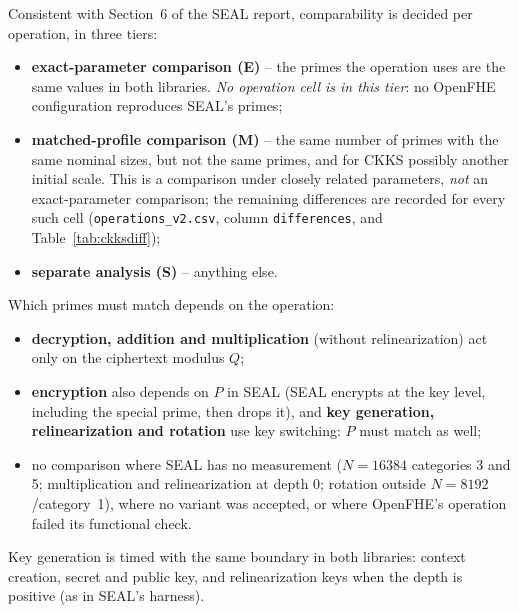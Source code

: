 \documentclass[11pt]{article}
\begin{document}
Consistent with Section~6 of the SEAL report, comparability is decided per operation, in three tiers:
\begin{itemize}[leftmargin=*, itemsep=1pt]
  \item \textbf{exact-parameter comparison (E)} -- the primes the operation uses are the same values in both libraries. \emph{No operation cell is in this tier}: no OpenFHE configuration reproduces SEAL's primes;
  \item \textbf{matched-profile comparison (M)} -- the same number of primes with the same nominal sizes, but not the same primes, and for CKKS possibly another initial scale. This is a comparison under closely related parameters, \emph{not} an exact-parameter comparison; the remaining differences are recorded for every such cell (\texttt{operations\_v2.csv}, column \texttt{differences}, and Table~\ref{tab:ckksdiff});
  \item \textbf{separate analysis (S)} -- anything else.
\end{itemize}
Which primes must match depends on the operation:
\begin{itemize}[leftmargin=*, itemsep=1pt]
  \item \textbf{decryption, addition and multiplication} (without relinearization) act only on the ciphertext modulus $Q$;
  \item \textbf{encryption} also depends on $P$ in SEAL (SEAL encrypts at the key level, including the special prime, then drops it), and \textbf{key generation, relinearization and rotation} use key switching: $P$ must match as well;
  \item no comparison where SEAL has no measurement ($N{=}16384$ categories 3 and 5; multiplication and relinearization at depth 0; rotation outside $N{=}8192$/category~1), where no variant was accepted, or where OpenFHE's operation failed its functional check.
\end{itemize}
Key generation is timed with the same boundary in both libraries: context creation, secret and public key, and relinearization keys when the depth is positive (as in SEAL's harness).

{\footnotesize
}
\vspace{-6pt}
\end{document}
